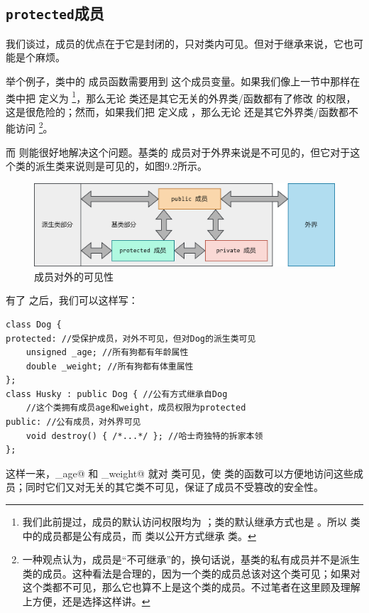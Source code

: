 \subsection*{\texttt{protected}成员}
我们谈过，\lstinline@private@ 成员的优点在于它是封闭的，只对类内可见。但对于继承来说，它也可能是个麻烦。\par
举个例子，\lstinline@Husky@ 类中的 \lstinline@destory@ 成员函数需要用到 \lstinline@weight@ 这个成员变量。如果我们像上一节中那样在 \lstinline@Dog@ 类中把 \lstinline@weight@ 定义为 \lstinline@public@\footnote{我们此前提过，\lstinline@struct@ 成员的默认访问权限均为 \lstinline@public@；\lstinline@struct@ 类的默认继承方式也是 \lstinline@public@。所以 \lstinline@Dog@ 类中的成员都是公有成员，而 \lstinline@Husky@ 类以公开方式继承 \lstinline@Dog@ 类。}，那么无论 \lstinline@Husky@ 类还是其它无关的外界类/函数都有了修改 \lstinline@weight@ 的权限，这是很危险的；然而，如果我们把 \lstinline@weight@ 定义成 \lstinline@private@，那么无论 \lstinline@Husky@ 还是其它外界类/函数都不能访问 \lstinline@weight@\footnote{一种观点认为，\lstinline@private@ 成员是``不可继承''的，换句话说，基类的私有成员并不是派生类的成员。这种看法是合理的，因为一个类的成员总该对这个类可见；如果对这个类都不可见，那么它也算不上是这个类的成员。不过笔者在这里顾及理解上方便，还是选择这样讲。}。\par
而 \lstinline@protected@ 则能很好地解决这个问题。基类的 \lstinline@protected@ 成员对于外界来说是不可见的，但它对于这个类的派生类来说则是可见的，如图9.2所示。\par
\begin{figure}[htbp]
    \centering
    \includegraphics[width=\textwidth]{../images/generalized_parts/09_protected_members.drawio.png}
    \caption{\lstinline@protected@ 成员对外的可见性}
\end{figure}
有了 \lstinline@protected@ 之后，我们可以这样写：
\begin{lstlisting}
class Dog {
protected: //受保护成员，对外不可见，但对Dog的派生类可见
    unsigned _age; //所有狗都有年龄属性
    double _weight; //所有狗都有体重属性
};
class Husky : public Dog { //公有方式继承自Dog
    //这个类拥有成员age和weight，成员权限为protected
public: //公有成员，对外界可见
    void destroy() { /*...*/ }; //哈士奇独特的拆家本领
};
\end{lstlisting}\par
这样一来，\lstinline@_age@ 和 \lstinline@_weight@ 就对 \lstinline@Husky@ 类可见，使 \lstinline@Husky@ 类的函数可以方便地访问这些成员；同时它们又对无关的其它类不可见，保证了成员不受篡改的安全性。\par
